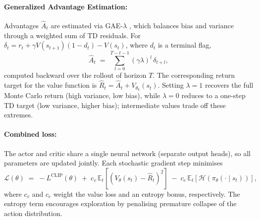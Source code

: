 \documentclass{article}
\begin{document}
\paragraph{Generalized Advantage Estimation:} Advantages $\hat{A}_t$ are estimated via GAE-$\lambda$ \citep{...}, which balances bias and variance through a weighted sum of TD residuals. For $\delta_t = r_t + \gamma V(s_{t+1})(1-d_t) - V(s_t)$, where $d_t$ is a terminal flag,
\begin{equation}
    \hat{A}_t \;=\; \sum_{l=0}^{T-t-1} (\gamma\lambda)^l\,\delta_{t+l},
    \label{eq:gae}
\end{equation}
computed backward over the rollout of horizon $T$. The corresponding return target for the value function is $\hat{R}_t = \hat{A}_t + V_{\theta_k}(s_t)$. Setting $\lambda = 1$ recovers the full Monte Carlo return (high variance, low bias), while $\lambda = 0$ reduces to a one-step TD target (low variance, higher bias); intermediate values trade off these extremes.

\paragraph{Combined loss:} The actor and critic share a single neural network (separate output heads), so all parameters are updated jointly. Each stochastic gradient step minimises
\begin{equation}
    \mathcal{L}(\theta)
    \;=\; -L^{\mathrm{CLIP}}(\theta)
    \;+\; c_v\,\mathbb{E}_t\!\left[\left(V_\theta(s_t) - \hat{R}_t\right)^2\right]
    \;-\; c_e\,\mathbb{E}_t\!\left[\mathcal{H}\!\left(\pi_\theta(\cdot \mid s_t)\right)\right],
    \label{eq:ppo-loss}
\end{equation}
where $c_v$ and $c_e$ weight the value loss and an entropy bonus, respectively. The entropy term encourages exploration by penalising premature collapse of the action distribution.

\end{document}
